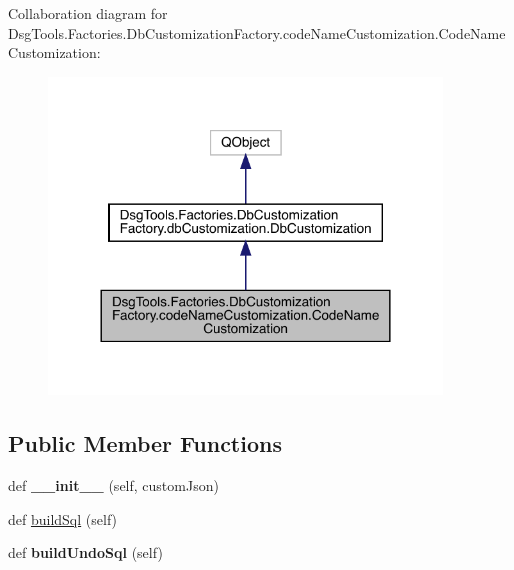 Collaboration diagram for Dsg\+Tools.\+Factories.\+Db\+Customization\+Factory.\+code\+Name\+Customization.\+Code\+Name\+Customization\+:
\nopagebreak
\begin{figure}[H]
\begin{center}
\leavevmode
\includegraphics[width=296pt]{class_dsg_tools_1_1_factories_1_1_db_customization_factory_1_1code_name_customization_1_1_code_name_customization__coll__graph}
\end{center}
\end{figure}
\subsection*{Public Member Functions}
\begin{DoxyCompactItemize}
\item 
\mbox{\label{class_dsg_tools_1_1_factories_1_1_db_customization_factory_1_1code_name_customization_1_1_code_name_customization_a62ee4d5960da39dda9841c71e29c02d3}} 
def {\bfseries \+\_\+\+\_\+init\+\_\+\+\_\+} (self, custom\+Json)
\item 
def \mbox{\hyperlink{class_dsg_tools_1_1_factories_1_1_db_customization_factory_1_1code_name_customization_1_1_code_name_customization_a2a3c553977adaad5a53c60e9fe9809e2}{build\+Sql}} (self)
\item 
\mbox{\label{class_dsg_tools_1_1_factories_1_1_db_customization_factory_1_1code_name_customization_1_1_code_name_customization_a0bf57b38257f2da19f764dbb1b0492fa}} 
def {\bfseries build\+Undo\+Sql} (self)
\end{DoxyCompactItemize}

